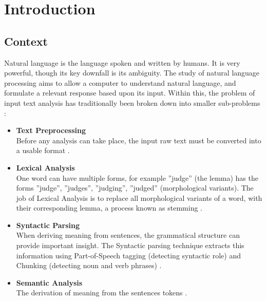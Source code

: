 \documentclass[]{article}
\begin{document}
\newpage

\tableofcontents

\newpage

\section{Introduction}
\label{sec:Intro}

\subsection{Context}
\label{sec:IntroContext}

Natural language is the language spoken and written by humans. It is very powerful, though its key downfall is its ambiguity. The study of natural language processing aims to allow a computer to understand natural language, and formulate a relevant response based upon its input. Within this, the problem of input text analysis has traditionally been broken down into smaller sub-problems \cite{NLPHandbook}:

\begin{itemize}
	\item \textbf{Text Preprocessing} \\
	Before any analysis can take place, the input raw text must be converted into a usable format \cite{NLPHandbook}.
	\item \textbf{Lexical Analysis} \\
	One word can have multiple forms, for example ”judge” (the lemma) has the
	forms {”judge”, ”judges”, ”judging”, ”judged”} (morphological variants). The job of Lexical Analysis is to replace all morphological variants of a word, with their corresponding lemma, a process known as stemming \cite{NLPHandbook}.
	\item \textbf{Syntactic Parsing} \\
	When deriving meaning from sentences, the grammatical structure can provide important insight. The Syntactic parsing technique extracts this information using Part-of-Speech tagging (detecting syntactic role) and Chunking (detecting noun and verb phrases) \cite{NLPHandbook}.
	\item \textbf{Semantic Analysis} \\
	The derivation of meaning from the sentences tokens \cite{NLPHandbook}. 
\end{itemize}
\end{document}
